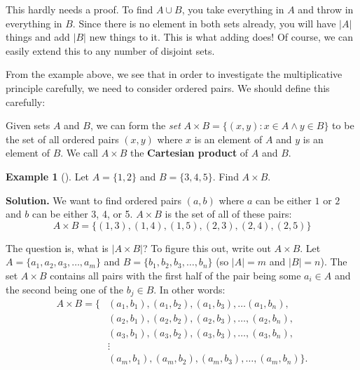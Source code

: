 \documentclass[12pt,]{book}
\newcommand{\terminology}[1]{\textbf{#1}}
\theoremstyle{plain}
\theoremstyle{definition}
\theoremstyle{definition}
\newtheorem{example}[theorem]{Example}
\theoremstyle{definition}
\numberwithin{equation}{chapter}
\newcommand{\st}{:}
\newcommand{\card}[1]{\left| #1 \right|}
\newcommand{\amp}{&}
\begin{document}
\hypertarget{p-739}{}%
This hardly needs a proof. To find \(A \cup B\), you take everything in \(A\) and throw in everything in \(B\). Since there is no element in both sets already, you will have \(\card{A}\) things and add \(\card{B}\) new things to it. This is what adding does! Of course, we can easily extend this to any number of disjoint sets.%
\par
\hypertarget{p-740}{}%
From the example above, we see that in order to investigate the multiplicative principle carefully, we need to consider ordered pairs. We should define this carefully:%
\begin{assemblage}\label{assemblage-14}
\hypertarget{p-741}{}%
Given sets \(A\) and \(B\), we can form the \emph{set} \(A \times B = \{(x,y) \st x \in A \wedge y \in B\}\) to be the set of all ordered pairs \((x,y)\) where \(x\) is an element of \(A\) and \(y\) is an element of \(B\). We call \(A \times B\) the \terminology{Cartesian product} of \(A\) and \(B\).%
\end{assemblage}
\begin{example}[]\label{example-40}
\hypertarget{p-742}{}%
Let \(A = \{1,2\}\) and \(B=\{3,4,5\}\). Find \(A \times B\).%
\par\smallskip%
\noindent\textbf{Solution.}\hypertarget{solution-87}{}\quad%
\hypertarget{p-743}{}%
We want to find ordered pairs \((a,b)\) where \(a\) can be either \(1\) or \(2\) and \(b\) can be either 3, 4, or 5. \(A \times B\) is the set of all of these pairs:%
\begin{equation*}
A \times B = \{(1,3), (1,4), (1,5), (2,3), (2,4), (2,5)\}
\end{equation*}
%
\end{example}
\hypertarget{p-744}{}%
The question is, what is \(\card{A \times B}\)? To figure this out, write out \(A \times B\). Let \(A = \{a_1,a_2, a_3, \ldots, a_m\}\) and \(B = \{b_1,b_2, b_3, \ldots, b_n\}\) (so \(\card{A} = m\) and \(\card{B} = n\)). The set \(A \times B\) contains all pairs with the first half of the pair being some \(a_i \in A\) and the second being one of the \(b_j \in B\). In other words:%
\begin{align*}
A \times B = \{ \amp (a_1, b_1), (a_1, b_2), (a_1, b_3), \ldots (a_1, b_n),\\
\amp (a_2, b_1), (a_2, b_2), (a_2, b_3), \ldots, (a_2, b_n),\\
\amp (a_3, b_1), (a_3, b_2), (a_3, b_3), \ldots, (a_3, b_n),\\
\amp \vdots\\
\amp (a_m, b_1), (a_m, b_2), (a_m, b_3), \ldots, (a_m, b_n)\}.
\end{align*}
\end{document}
